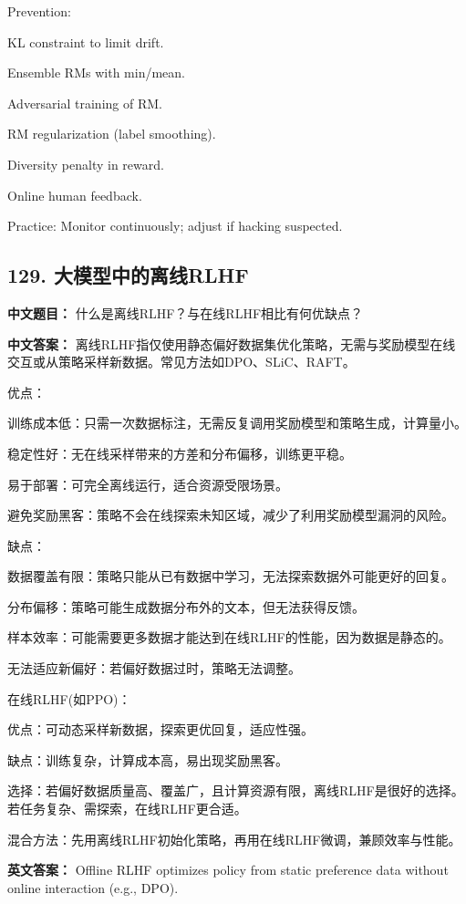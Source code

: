 \documentclass[10pt,a4paper]{ctexart}
\begin{document}
Prevention:

KL constraint to limit drift.

Ensemble RMs with min/mean.

Adversarial training of RM.

RM regularization (label smoothing).

Diversity penalty in reward.

Online human feedback.

Practice: Monitor continuously; adjust if hacking suspected.

\subsection*{129. 大模型中的离线RLHF}
\textbf{中文题目：} 什么是离线RLHF？与在线RLHF相比有何优缺点？

\textbf{中文答案：}
离线RLHF指仅使用静态偏好数据集优化策略，无需与奖励模型在线交互或从策略采样新数据。常见方法如DPO、SLiC、RAFT。

优点：

训练成本低：只需一次数据标注，无需反复调用奖励模型和策略生成，计算量小。

稳定性好：无在线采样带来的方差和分布偏移，训练更平稳。

易于部署：可完全离线运行，适合资源受限场景。

避免奖励黑客：策略不会在线探索未知区域，减少了利用奖励模型漏洞的风险。

缺点：

数据覆盖有限：策略只能从已有数据中学习，无法探索数据外可能更好的回复。

分布偏移：策略可能生成数据分布外的文本，但无法获得反馈。

样本效率：可能需要更多数据才能达到在线RLHF的性能，因为数据是静态的。

无法适应新偏好：若偏好数据过时，策略无法调整。

在线RLHF(如PPO)：

优点：可动态采样新数据，探索更优回复，适应性强。

缺点：训练复杂，计算成本高，易出现奖励黑客。

选择：若偏好数据质量高、覆盖广，且计算资源有限，离线RLHF是很好的选择。若任务复杂、需探索，在线RLHF更合适。

混合方法：先用离线RLHF初始化策略，再用在线RLHF微调，兼顾效率与性能。

\textbf{英文答案：}
Offline RLHF optimizes policy from static preference data without online interaction (e.g., DPO).
\end{document}
